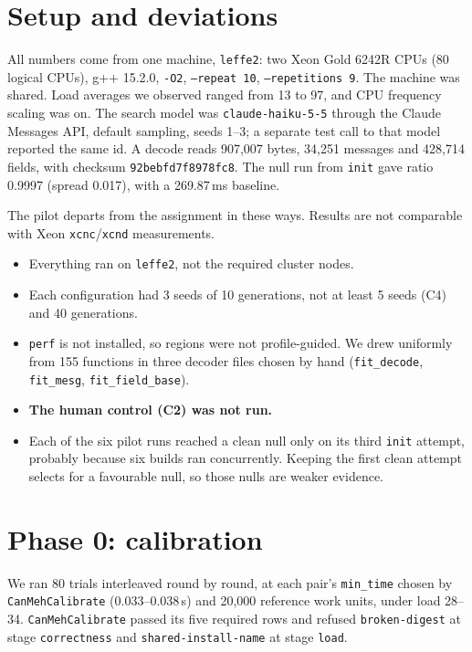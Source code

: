 \documentclass[10pt,twocolumn]{article}
\begin{document}
\section{Setup and deviations}
All numbers come from one machine, \texttt{leffe2}: two Xeon Gold 6242R CPUs (80
logical CPUs), g++ 15.2.0, \texttt{-O2}, \texttt{--repeat 10}, \texttt{--repetitions
9}. The machine was shared. Load averages we observed ranged from 13 to 97, and CPU
frequency scaling was on. The search model was \texttt{claude-haiku-5-5} through the
Claude Messages API, default sampling, seeds 1--3; a separate test call to that
model reported the same id. A decode reads 907,007 bytes, 34,251 messages and
428,714 fields, with checksum \texttt{92bebfd7f8978fc8}. The null run from
\texttt{init} gave ratio 0.9997 (spread 0.017), with a 269.87\,ms baseline.

The pilot departs from the assignment in these ways. Results are not comparable
with Xeon \texttt{xcnc}/\texttt{xcnd} measurements.
\begin{itemize}\setlength{\itemsep}{0pt}
\item Everything ran on \texttt{leffe2}, not the required cluster nodes.
\item Each configuration had 3 seeds of 10 generations, not at least 5 seeds (C4)
and 40 generations.
\item \texttt{perf} is not installed, so regions were not profile-guided. We drew
uniformly from 155 functions in three decoder files chosen by hand
(\texttt{fit\_decode}, \texttt{fit\_mesg}, \texttt{fit\_field\_base}).
\item \textbf{The human control (C2) was not run.}
\item Each of the six pilot runs reached a clean null only on its third
\texttt{init} attempt, probably because six builds ran concurrently. Keeping the first clean
attempt selects for a favourable null, so those nulls are weaker evidence.
\end{itemize}

\section{Phase 0: calibration}
We ran 80 trials interleaved round by round, at each pair's \texttt{min\_time} chosen
by \texttt{CanMehCalibrate} (0.033--0.038\,s) and 20,000 reference work units, under
load 28--34. \texttt{CanMehCalibrate} passed its five required rows and refused
\texttt{broken-digest} at stage \texttt{correctness} and
\texttt{shared-install-name} at stage \texttt{load}.
\end{document}
